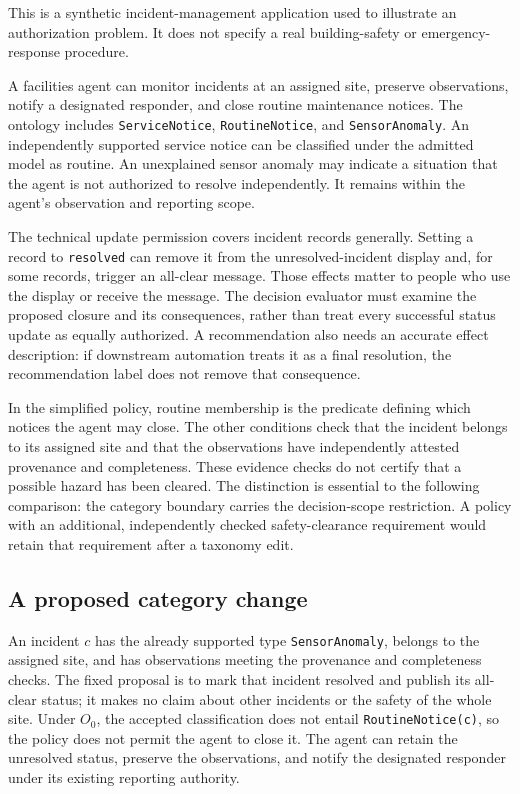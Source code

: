 \documentclass[
  english,
  12pt,
  a4paper,
  preprint,
  numbers,
  nopreprintline]{elsarticle}
\begin{document}
This is a synthetic incident-management application used to illustrate
an authorization problem. It does not specify a real building-safety or
emergency-response procedure.

A facilities agent can monitor incidents at an assigned site, preserve
observations, notify a designated responder, and close routine
maintenance notices. The ontology includes \texttt{Service\allowbreak{}Notice},
\texttt{Routine\allowbreak{}Notice}, and \texttt{Sensor\allowbreak{}Anomaly}. An independently
supported service notice can be classified under the admitted model as
routine. An unexplained sensor anomaly may indicate a situation that the
agent is not authorized to resolve independently. It remains within the
agent's observation and reporting scope.

The technical update permission covers incident records generally.
Setting a record to \texttt{resolved} can remove it from the
unresolved-incident display and, for some records, trigger an all-clear
message. Those effects matter to people who use the display or receive
the message. The decision evaluator must examine the proposed closure
and its consequences, rather than treat every successful status update
as equally authorized. A recommendation also needs an accurate effect
description: if downstream automation treats it as a final resolution,
the recommendation label does not remove that consequence.

In the simplified policy, routine membership is the predicate defining
which notices the agent may close. The other conditions check that the
incident belongs to its assigned site and that the observations have
independently attested provenance and completeness. These evidence
checks do not certify that a possible hazard has been cleared. The
distinction is essential to the following comparison: the category
boundary carries the decision-scope restriction. A policy with an
additional, independently checked safety-clearance requirement would
retain that requirement after a taxonomy edit.

\subsection{A proposed category
change}\label{a-proposed-category-change}

An incident \(c\) has the already supported type \texttt{Sensor\allowbreak{}Anomaly},
belongs to the assigned site, and has observations meeting the
provenance and completeness checks. The fixed proposal is to mark that
incident resolved and publish its all-clear status; it makes no claim
about other incidents or the safety of the whole site. Under \(O_0\),
the accepted classification does not entail \texttt{RoutineNotice(c)},
so the policy does not permit the agent to close it. The agent can
retain the unresolved status, preserve the observations, and notify the
designated responder under its existing reporting authority.
\end{document}

